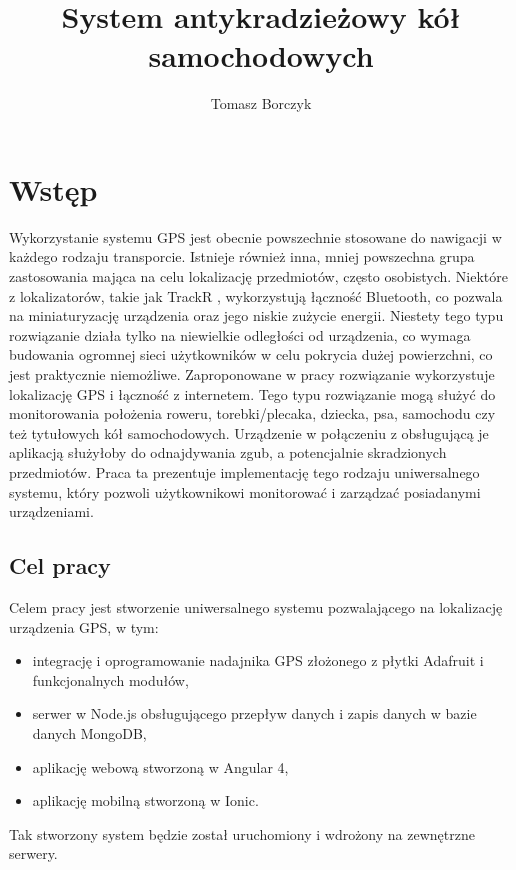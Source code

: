\documentclass[eng,printmode]{mgr}
\title{System antykradzieżowy kół samochodowych}
\author{Tomasz Borczyk}
\begin{document}
\maketitle %
\tableofcontents


\chapter{Wstęp}
Wykorzystanie systemu GPS jest obecnie powszechnie stosowane do nawigacji w każdego rodzaju transporcie. Istnieje również inna, mniej powszechna grupa zastosowania mająca na celu lokalizację przedmiotów, często osobistych. Niektóre z lokalizatorów, takie jak TrackR \cite{TrackR}, wykorzystują łączność Bluetooth, co pozwala na miniaturyzację urządzenia oraz jego niskie zużycie energii. Niestety tego typu rozwiązanie działa tylko na niewielkie odległości od urządzenia, co wymaga budowania ogromnej sieci użytkowników w celu pokrycia dużej powierzchni, co jest praktycznie niemożliwe. Zaproponowane w pracy rozwiązanie wykorzystuje lokalizację GPS i łączność z internetem. Tego typu rozwiązanie mogą służyć do monitorowania położenia roweru, torebki/plecaka, dziecka, psa, samochodu czy też tytułowych kół samochodowych. Urządzenie w połączeniu z obsługującą je aplikacją służyłoby do odnajdywania zgub, a potencjalnie skradzionych przedmiotów. Praca ta prezentuje implementację tego rodzaju uniwersalnego systemu, który pozwoli użytkownikowi monitorować i zarządzać posiadanymi urządzeniami.

\section{Cel pracy}
Celem pracy jest stworzenie uniwersalnego systemu pozwalającego na lokalizację urządzenia GPS, w tym:
\begin{itemize}
\item integrację i oprogramowanie nadajnika GPS złożonego z płytki Adafruit i funkcjonalnych modułów,
\item serwer w Node.js obsługującego przepływ danych i zapis danych w bazie danych MongoDB,
\item aplikację webową stworzoną w Angular 4,
\item aplikację mobilną stworzoną w Ionic.
\end{itemize}
Tak stworzony system będzie został uruchomiony i wdrożony na zewnętrzne serwery.
\end{document}
